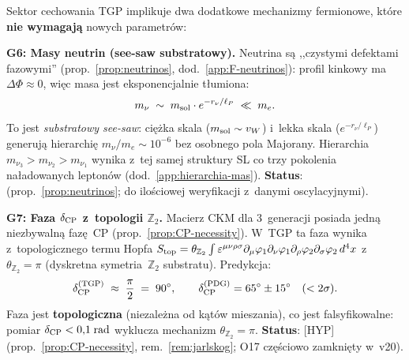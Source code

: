 \begin{remark}%
\label{rem:neutrino-CKM-sketch}
Sektor cechowania TGP implikuje dwa dodatkowe mechanizmy
fermionowe, kt\'ore \textbf{nie wymagaj\k{a}} nowych
parametr\'ow:

\medskip\noindent
\textbf{G6: Masy neutrin (see-saw substratowy).}\;
Neutrina s\k{a} ,,czystymi defektami fazowymi''
(prop.~\ref{prop:neutrinos}, dod.~\ref{app:F-neutrinos}):
profil kinkowy ma $\Delta\Phi \approx 0$, wi\k{e}c masa
jest eksponencjalnie t\l{}umiona:
\begin{equation}\label{eq:neutrino-seesaw}
  m_\nu \;\sim\; m_{\rm sol} \cdot e^{-r_\nu / \ell_P}
  \;\ll\; m_e.
\end{equation}
To jest \emph{substratowy see-saw}: ci\k{e}\.zka skala
($m_{\rm sol} \sim v_W$) i~lekka skala ($e^{-r_\nu/\ell_P}$)
generuj\k{a} hierarchi\k{e} $m_\nu/m_e \sim 10^{-6}$ bez
osobnego pola Majorany. Hierarchia $m_{\nu_3} > m_{\nu_2}
> m_{\nu_1}$ wynika z~tej samej struktury SL co trzy pokolenia
naładowanych lepton\'ow (dod.~\ref{app:hierarchia-mas}).
\textbf{Status}: 
(prop.~\ref{prop:neutrinos}; do ilo\'sciowej weryfikacji
z~danymi oscylacyjnymi).

\medskip\noindent
\textbf{G7: Faza $\delta_{\rm CP}$ z~topologii $\mathbb{Z}_2$.}\;
Macierz CKM dla 3~generacji posiada jedn\k{a} niezbywaln\k{a}
faz\k{e}~CP (prop.~\ref{prop:CP-necessity}). W~TGP ta faza
wynika z~topologicznego termu Hopfa
$S_{\rm top} = \theta_{\mathbb{Z}_2} \int \varepsilon^{\mu\nu\rho\sigma}
\partial_\mu\varphi_1 \partial_\nu\varphi_1
\partial_\rho\varphi_2 \partial_\sigma\varphi_2\,d^4x$
z~$\theta_{\mathbb{Z}_2} = \pi$ (dyskretna symetria~$\mathbb{Z}_2$
substratu). Predykcja:
\begin{equation}\label{eq:delta-CP-TGP}
  \delta_{\rm CP}^{\rm (TGP)} \;\approx\; \frac{\pi}{2}
  \;=\; 90^\circ,
  \qquad
  \delta_{\rm CP}^{\rm (PDG)} = 65^\circ \pm 15^\circ
  \quad (<2\sigma).
\end{equation}
Faza jest \textbf{topologiczna} (niezale\.zna od k\k{a}t\'ow mieszania),
co jest falsyfikowalne: pomiar $\delta_{\rm CP} < 0{,}1\;\mathrm{rad}$
wyklucza mechanizm $\theta_{\mathbb{Z}_2} = \pi$.
\textbf{Status}:  [HYP]
(prop.~\ref{prop:CP-necessity}, rem.~\ref{rem:jarlskog};
O17 cz\k{e}\'sciowo zamkni\k{e}ty w~v20).
\end{remark}
